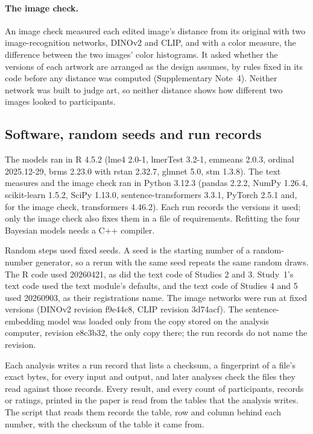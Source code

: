 \paragraph*{The image check.}
An image check measured each edited image's distance from its original with two image-recognition networks, DINOv2 and CLIP,\cite{oquab2024dinov2,radford2021learning} and with a color measure, the difference between the two images' color histograms. It asked whether the versions of each artwork are arranged as the design assumes, by rules fixed in its code before any distance was computed (Supplementary Note~4). Neither network was built to judge art, so neither distance shows how different two images looked to participants.

\subsection*{Software, random seeds and run records}

The models ran in R 4.5.2 (lme4 2.0-1, lmerTest 3.2-1, emmeans 2.0.3, ordinal 2025.12-29, brms 2.23.0 with rstan 2.32.7, glmnet 5.0, stm 1.3.8). The text measures and the image check ran in Python 3.12.3 (pandas 2.2.2, NumPy 1.26.4, scikit-learn 1.5.2, SciPy 1.13.0, sentence-transformers 3.3.1, PyTorch 2.5.1 and, for the image check, transformers 4.46.2). Each run records the versions it used; only the image check also fixes them in a file of requirements. Refitting the four Bayesian models needs a C++ compiler.

Random steps used fixed seeds. A seed is the starting number of a random-number generator, so a rerun with the same seed repeats the same random draws. The R code used 20260421, as did the text code of Studies 2 and 3. Study~1's text code used the text module's defaults, and the text code of Studies 4 and 5 used 20260903, as their registrations name. The image networks were run at fixed versions (DINOv2 revision f9e44c8, CLIP revision 3d74acf). The sentence-embedding model was loaded only from the copy stored on the analysis computer, revision e8c3b32, the only copy there; the run records do not name the revision.

Each analysis writes a run record that lists a checksum, a fingerprint of a file's exact bytes, for every input and output, and later analyses check the files they read against those records. Every result, and every count of participants, records or ratings, printed in the paper is read from the tables that the analysis writes. The script that reads them records the table, row and column behind each number, with the checksum of the table it came from.
